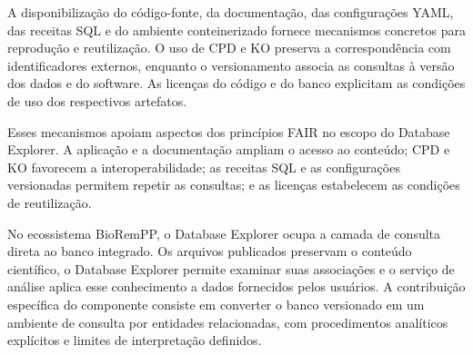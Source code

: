 A disponibilização do código-fonte, da documentação, das configurações YAML,
das receitas SQL e do ambiente conteinerizado fornece mecanismos concretos
para reprodução e reutilização. O uso de CPD e KO preserva a correspondência
com identificadores externos, enquanto o versionamento associa as consultas à
versão dos dados e do software. As licenças do código e do banco explicitam as
condições de uso dos respectivos artefatos.

Esses mecanismos apoiam aspectos dos princípios FAIR no escopo do Database
Explorer. A aplicação e a documentação ampliam o acesso ao conteúdo; CPD e KO
favorecem a interoperabilidade; as receitas SQL e as configurações versionadas
permitem repetir as consultas; e as licenças estabelecem as condições de
reutilização.

No ecossistema BioRemPP, o Database Explorer ocupa a camada de consulta direta
ao banco integrado. Os arquivos publicados preservam o conteúdo científico, o
Database Explorer permite examinar suas associações e o serviço de análise
aplica esse conhecimento a dados fornecidos pelos usuários. A contribuição
específica do componente consiste em converter o banco versionado em um
ambiente de consulta por entidades relacionadas, com procedimentos analíticos
explícitos e limites de interpretação definidos.
